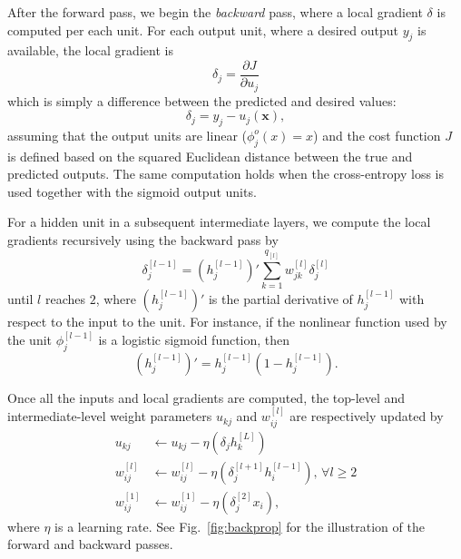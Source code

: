 \documentclass[dissertation,nocontribution,draft*]{aaltoseries}
\newcommand{\qlay}[1]{\left[#1\right]}
\newcommand{\vect}[1]{\mathbf{#1}}
\newcommand{\vx}[0]{\vect{x}}
\begin{document}
After the forward pass, we begin the \textit{backward} pass,
where a local gradient $\delta$ is computed per each unit.
For each output unit, where a desired output $y_j$ is
available, the local gradient is
\[
\delta_j = \frac{\partial J}{\partial u_j} 
\]
which is simply a difference between the predicted and
desired values:
\[
\delta_j = y_j - u_j(\vx),
\]
assuming that the output units are linear
($\phi_j^o(x) = x$) and the cost function $J$ is defined
based on the squared Euclidean distance between the true and
predicted outputs. The same computation holds when the
cross-entropy loss is used together with the sigmoid output
units.

For a hidden unit in a subsequent intermediate layers, we
compute the local gradients recursively using the backward
pass
by
\[
\delta_j^{\qlay{l-1}} = \left(h_j^{\qlay{l-1}}\right)'
\sum_{k=1}^{q_{\qlay{l}}}
w_{jk}^{\qlay{l}} \delta_j^{\qlay{l}}
\]
until $l$ reaches $2$, where $\left(h_j^{\qlay{l-1}}\right)'$ is
the partial derivative of $h_j^{\qlay{l-1}}$ with respect to the
input to the unit. For instance, if the nonlinear function
used by the unit $\phi_j^{\qlay{l-1}}$ is a logistic sigmoid
function, then
\[
\left(h_j^{\qlay{l-1}}\right)' = h_j^{\qlay{l-1}} \left( 1 -
h_j^{\qlay{l-1}} \right).
\]

Once all the inputs and local gradients are computed, the
top-level and intermediate-level weight parameters $u_{kj}$
and $w_{ij}^{\qlay{l}}$ are respectively updated by
\begin{align}
    \label{eq:backprop}
    u_{kj} &\leftarrow u_{kj} - \eta \left( \delta_j
    h_k^{\qlay{L}}
    \right) 
    \nonumber \\
    w_{ij}^{\qlay{l}} &\leftarrow w_{ij}^{\qlay{l}} - \eta \left(
    \delta_j^{\qlay{l+1}} h_i^{\qlay{l-1}}\right) \text{, }\forall l \geq 2 
    \nonumber \\
    w_{ij}^{\qlay{1}} &\leftarrow w_{ij}^{\qlay{1}} - \eta \left(
    \delta_j^{\qlay{2}} x_i
    \right),
\end{align}
where $\eta$ is a learning rate. See Fig.~\ref{fig:backprop}
for the illustration of the forward and backward passes.
\end{document}
